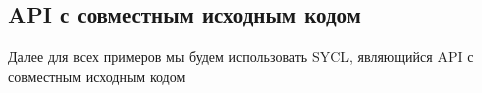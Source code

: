 \documentclass[a4paper,12pt,oneside]{article}
\begin{document}
\subsection{API с совместным исходным кодом}\label{subsec:typesafety}

Далее для всех примеров мы будем использовать SYCL, являющийся API с совместным исходным кодом


\end{document}
